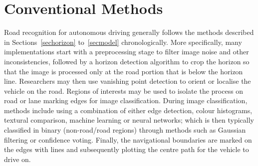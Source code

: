 \section{Conventional Methods} \label{secalgo}
Road recognition for autonomous driving generally follows the methods described in Sections~\ref{sechorizon} to~\ref{secmodel} chronologically. More specifically, many implementations start with a preprocessing stage to filter image noise and other inconsistencies, followed by a horizon detection algorithm to crop the horizon so that the image is processed only at the road portion that is below the horizon line. Researchers may then use vanishing point detection to orient or localise the vehicle on the road. Regions of interests may be used to isolate the process on road or lane marking edges for image classification. During image classification, methods include using a combination of either edge detection, colour histograms, textural comparison, machine learning or neural networks; which is then typically classified in binary (non-road/road regions) through methods such as Gaussian filtering or confidence voting. Finally, the navigational boundaries are marked on the edges with lines and subsequently plotting the centre path for the vehicle to drive on.

